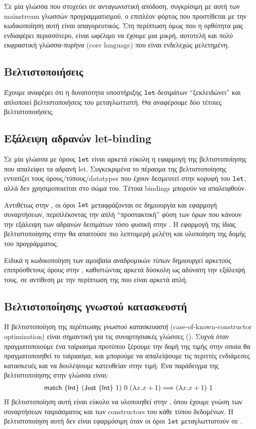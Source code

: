 Σε μία γλώσσα που στοχεύει σε ανταγωνιστική απόδοση, συγκρίσιμη με αυτή των
mainstream γλωσσών προγραμματισμού, ο επιπλέον φόρτος που προστίθεται με την
κωδικοποίηση αυτή είναι απαγορευτικός.  Στη περίπτωση όμως που η ορθότητα μας
ενδιαφέρει περισσότερο, είναι ωφέλιμο να έχουμε μια μικρή, αυτοτελή και πολύ
εκφραστική γλώσσα-πυρήνα (core language) που είναι ενδελεχώς μελετημένη.

\subsection{Βελτιστοποιήσεις}

Έχουμε αναφέρει ότι η δυνατότητα υποστήριξης $\operatorname{\texttt{let}}$-δεσιμάτων ``ξεκλειδώνει''
και απλοποιεί βελτιστοποιήσεις του μεταγλωττιστή. Θα αναφέρουμε δύο τέτοιες
βελτιστοποιήσεις.


\subsection{Εξάλειψη αδρανών let-binding}

Σε μία γλώσσα με όρους $\operatorname{\texttt{let}}$ είναι αρκετά εύκολη η εφαρμογή της
βελτιστοποίησης που απαλείφει τα αδρανή let. Συγκεκριμένα το πέρασμα της
βελτιστοποίησης εντοπίζει τους όρους/τύπους/datatypes που έχουν δεσμευτεί στην
κορυφή του $\operatorname{\texttt{let}}$, αλλά δεν χρησιμοποιείται στο σώμα του. Τέτοια bindings
μπορούν να απαλειφθούν.

Αντιθέτως στην \FOMF{}, οι όροι $\operatorname{\texttt{let}}$ μεταφράζονται σε δημιουργία και
εφαρμογή συναρτήσεων, περιπλέκοντας την απλή ``προστακτική'' φύση των όρων που
κάνουν την εξάλειψη των αδρανών δεσιμάτων τόσο φυσική στην \FIR{}.  Η εφαρμογή
της ίδιας βελτιστοποίησης στην \FOMF{} θα απαιτούσε πιο λεπτομερή μελέτη και
υλοποίηση της δομής του προγράμματος.

Ειδικά η κωδικοποίηση των αμοιβαία αναδρομικών τύπων δημιουργεί αρκετούς
επιπρόσθετους όρους στην \FOMF{}, καθιστώντας αρκετά δύσκολη ως αδύνατη την
εξάλειψή τους, σε αντίθεση με την περίπτωση της \FIR{} που είναι αρκετά απλή.


\subsection{Βελτιστοποίησης γνωστού κατασκευστή}

Η βελτιστοποίηση της \emph{περίπτωσης γνωστού κατασκευαστή}
(case-of-known-constructor optimization) είναι σημαντική για τις συναρτησιακές
γλώσσες (\cite{jones1998transformation}).  Συχνά όταν πραγματοποιούμε ένα
ταίριασμα προτύπου ξέρουμε την δομή της τιμής στην οποία θα πραγματοποιηθεί το
ταίριασμα, και μπορούμε να απαλείψουμε τις περιττές ενδιάμεσες κατασκευές και
να δουλέψουμε κατευθείαν στην τιμή. Ένα παράδειγμα της βελτιστοποίησης στην
γλώσσα \FIR{} είναι:
%
\begin{align*} \operatorname{\textsf{match}}\ \{\operatorname{\textsf{Int}}\}\ (\operatorname{\textsf{Just}}\ \{\operatorname{\textsf{Int}}\}\ 1)\ 0\ (\lambda x . x+1)
\Longrightarrow (\lambda x . x+1)\ 1 \end{align*}
%
  Η βελτιστοποίηση αυτή είναι εύκολο να υλοποιηθεί στην \FIR{}, όπου έχουμε
  γνώση των συναρτήσεων ταιριάσματος και των constructors του κάθε τύπου
  δεδομένων.  Η βελτιστοποίηση αυτή δεν είναι εφαρμόσιμη όταν οι όροι $\operatorname{\texttt{let}}$
  μεταγλωττιστούν σε \FOMF{}.



